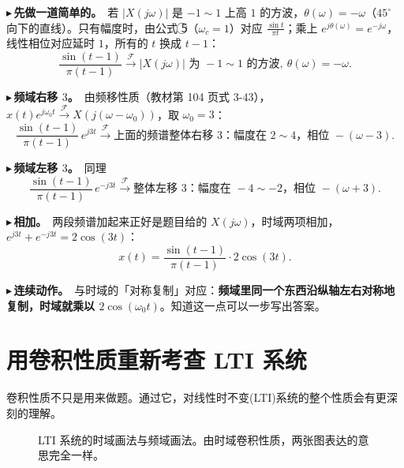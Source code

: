 \documentclass[UTF8,a4paper,11pt]{ctexart}
\newcommand{\F}{\mathcal{F}}
\newcommand{\cn}[1]{\textcircled{\scriptsize #1}}
\newcounter{ex}[section]
\newcommand{\point}[1]{\par\addvspace{1ex}\noindent\textcolor{ptteal}{$\blacktriangleright$\,\textbf{#1}}\ }
\begin{document}
\point{先做一道简单的。}若 $|X(j\omega)|$ 是 $-1\sim1$ 上高 $1$ 的方波，$\theta(\omega)=-\omega$（$45^\circ$ 向下的直线）。只有幅度时，由公式 \cn5（$\omega_c=1$）对应 $\frac{\sin t}{\pi t}$；乘上 $e^{j\theta(\omega)}=e^{-j\omega}$，线性相位对应延时 $1$，所有的 $t$ 换成 $t-1$：
\[
\frac{\sin(t-1)}{\pi(t-1)}\xrightarrow{\F}|X(j\omega)|\text{ 为 }-1\sim1\text{ 的方波},\ \theta(\omega)=-\omega .
\]
\point{频域右移 $3$。}由频移性质（教材第 104 页式 3-43），$x(t)e^{j\omega_0t}\xrightarrow{\F}X(j(\omega-\omega_0))$，取 $\omega_0=3$：
\[
\frac{\sin(t-1)}{\pi(t-1)}\,e^{j3t}\xrightarrow{\F}\text{上面的频谱整体右移 }3\text{：幅度在 }2\sim4\text{，相位 }-(\omega-3).
\]
\point{频域左移 $3$。}同理
\[
\frac{\sin(t-1)}{\pi(t-1)}\,e^{-j3t}\xrightarrow{\F}\text{整体左移 }3\text{：幅度在 }-4\sim-2\text{，相位 }-(\omega+3).
\]
\point{相加。}两段频谱加起来正好是题目给的 $X(j\omega)$，时域两项相加，$e^{j3t}+e^{-j3t}=2\cos(3t)$：
\[
x(t)=\frac{\sin(t-1)}{\pi(t-1)}\cdot2\cos(3t).
\]
\point{连续动作。}与时域的「对称复制」对应：\textbf{频域里同一个东西沿纵轴左右对称地复制，时域就乘以 $2\cos(\omega_0t)$}。知道这一点可以一步写出答案。

\section{用卷积性质重新考查 LTI 系统}\label{sec:lti}
卷积性质不只是用来做题。通过它，对线性时不变(LTI)系统的整个性质会有更深刻的理解。

\begin{figure}[H]
\centering
{}
\caption{LTI 系统的时域画法与频域画法。由时域卷积性质，两张图表达的意思完全一样。}
\label{fig:lti}
\end{figure}
\end{document}
